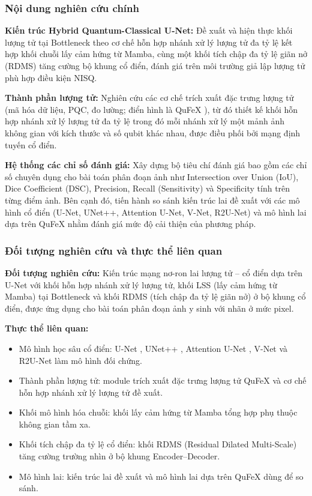 \documentclass[14pt]{article}  %
\begin{document}
{    \subsubsection{Nội dung nghiên cứu chính}

    \textbf{Kiến trúc Hybrid Quantum-Classical U-Net:} Đề xuất và hiện thực khối lượng tử tại Bottleneck theo cơ chế hỗn hợp nhánh xử lý lượng tử đa tỷ lệ kết hợp khối chuỗi lấy cảm hứng từ Mamba, cùng một khối tích chập đa tỷ lệ giãn nở (RDMS) tăng cường bộ khung cổ điển, đánh giá trên môi trường giả lập lượng tử phù hợp điều kiện NISQ.

    \textbf{Thành phần lượng tử:} Nghiên cứu các cơ chế trích xuất đặc trưng lượng tử (mã hóa dữ liệu, PQC, đo lường; điển hình là QuFeX \cite{qufex2025}), từ đó thiết kế khối hỗn hợp nhánh xử lý lượng tử đa tỷ lệ trong đó mỗi nhánh xử lý một mảnh ảnh không gian với kích thước và số qubit khác nhau, được điều phối bởi mạng định tuyến cổ điển.

    \textbf{Hệ thống các chỉ số đánh giá:} Xây dựng bộ tiêu chí đánh giá bao gồm các chỉ số chuyên dụng cho bài toán phân đoạn ảnh như Intersection over Union (IoU), Dice Coefficient (DSC), Precision, Recall (Sensitivity) và Specificity tính trên từng điểm ảnh. Bên cạnh đó, tiến hành so sánh kiến trúc lai đề xuất với các mô hình cổ điển (U-Net, UNet++, Attention U-Net, V-Net, R2U-Net) và mô hình lai dựa trên QuFeX nhằm đánh giá mức độ cải thiện của phương pháp.

    \subsubsection{Đối tượng nghiên cứu và thực thể liên quan}

    \textbf{Đối tượng nghiên cứu:} Kiến trúc mạng nơ-ron lai lượng tử -- cổ điển dựa trên U-Net với khối hỗn hợp nhánh xử lý lượng tử, khối LSS (lấy cảm hứng từ Mamba) tại Bottleneck và khối RDMS (tích chập đa tỷ lệ giãn nở) ở bộ khung cổ điển, được ứng dụng cho bài toán phân đoạn ảnh y sinh với nhãn ở mức pixel.

    \textbf{Thực thể liên quan:}

    \begin{itemize}
        \item Mô hình học sâu cổ điển: U-Net \cite{ronneberger2015unet}, UNet++ \cite{zhou2018unetplusplus}, Attention U-Net \cite{oktay2018attention}, V-Net \cite{milletari2016vnet} và R2U-Net \cite{alom2018r2unet} làm mô hình đối chứng.
        \item Thành phần lượng tử: module trích xuất đặc trưng lượng tử QuFeX \cite{qufex2025} và cơ chế hỗn hợp nhánh xử lý lượng tử đề xuất.
        \item Khối mô hình hóa chuỗi: khối lấy cảm hứng từ Mamba \cite{gu2023mamba} tổng hợp phụ thuộc không gian tầm xa.
        \item Khối tích chập đa tỷ lệ cổ điển: khối RDMS (Residual Dilated Multi-Scale) tăng cường trường nhìn ở bộ khung Encoder--Decoder.
        \item Mô hình lai: kiến trúc lai đề xuất và mô hình lai dựa trên QuFeX dùng để so sánh.
    \end{itemize}

}
\end{document}
